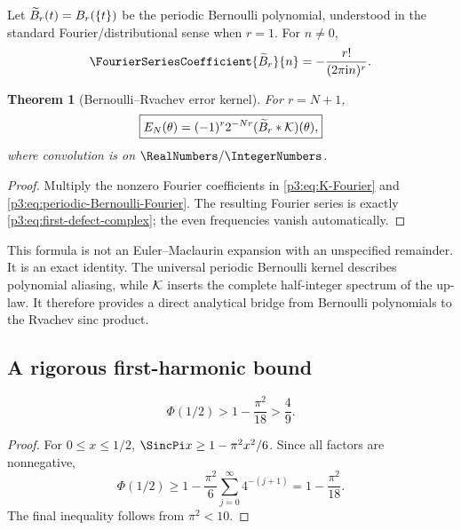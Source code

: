 \documentclass[11pt,oneside]{article}
\numberwithin{equation}{section}
\newtheorem{theorem}{Theorem}[section]
\theoremstyle{definition}
\theoremstyle{remark}
\begin{document}
Let $\widetilde B_r(t)=B_r(\{t\})$ be the periodic Bernoulli polynomial, understood in the standard Fourier/distributional sense when $r=1$.  For $n\ne0$,
\begin{equation}
 \FourierSeriesCoefficient{\Bper_r}{n}=-\frac{r!}{(2\pi\iu n)^r}.
 \label{p3:eq:periodic-Bernoulli-Fourier}
\end{equation}

\begin{theorem}[Bernoulli--Rvachev error kernel]
\label{p3:thm:Bernoulli-convolution}
For $r=N+1$,
\begin{equation}
 \boxed{\displaystyle
 E_N(\theta)=(-1)^r2^{-Nr}
 (\widetilde B_r*\mathcal K)(\theta),}
 \label{p3:eq:Bernoulli-convolution}
\end{equation}
where convolution is on $\RealNumbers/\IntegerNumbers$.
\end{theorem}

\begin{proof}
Multiply the nonzero Fourier coefficients in \eqref{p3:eq:K-Fourier} and \eqref{p3:eq:periodic-Bernoulli-Fourier}.  The resulting Fourier series is exactly \eqref{p3:eq:first-defect-complex}; the even frequencies vanish automatically.
\end{proof}

\begin{remark}
This formula is not an Euler--Maclaurin expansion with an unspecified remainder.  It is an exact identity.  The universal periodic Bernoulli kernel describes polynomial aliasing, while $\mathcal K$ inserts the complete half-integer spectrum of the up-law.  It therefore provides a direct analytical bridge from Bernoulli polynomials to the Rvachev sinc product.
\end{remark}

\subsection{A rigorous first-harmonic bound}

\begin{lemma}
\label{p3:lem:phi-half-lower}
\begin{equation}
 \Phi(1/2)>1-\frac{\pi^2}{18}>\frac49.
 \label{p3:eq:phi-half-lower}
\end{equation}
\end{lemma}

\begin{proof}
For $0\le x\le1/2$, $\SincPi x\ge1-\pi^2x^2/6$.  Since all factors are nonnegative,
\[
 \Phi(1/2)
 \ge1-\frac{\pi^2}{6}\sum_{j=0}^{\infty}4^{-(j+1)}
 =1-\frac{\pi^2}{18}.
\]
The final inequality follows from $\pi^2<10$.
\end{proof}
\end{document}
